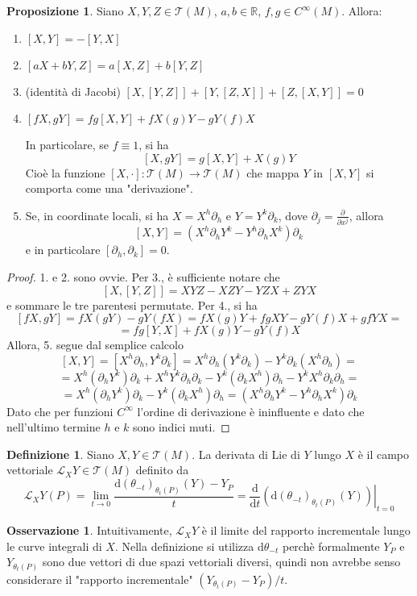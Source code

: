 \documentclass[a4paper,11pt]{article}
\theoremstyle{definition}
\newtheorem{osservazione}{Osservazione}[section]
\newtheorem{definizione}{Definizione}[section]
\theoremstyle{theorem}
\newtheorem{proposizione}{Proposizione}[section]
\newcommand{\lie}[2]{\mathcal{L}_{#1}#2}
\newcommand{\dif}{\mathrm{d}}
\begin{document}
\begin{proposizione}
	Siano $X,Y,Z\in\mathcal{T}(M)$, $a,b\in\mathbb{R}$, $f,g\in C^\infty(M)$. Allora:
	\begin{enumerate}
		\item $[X,Y]=-[Y,X]$
		\item $[aX+bY,Z]=a[X,Z]+b[Y,Z]$
		\item (identità di Jacobi) $[X,[Y,Z]]+[Y,[Z,X]]+[Z,[X,Y]]=0$
		\item $[fX,gY]=fg[X,Y]+fX(g)Y-gY(f)X$
		
		In particolare, se $f\equiv 1$, si ha \[[X,gY]=g[X,Y]+X(g)Y\]
		Cioè la funzione $[X,\cdot]\colon\mathcal{T}(M)\to\mathcal{T}(M)$ che mappa $Y$ in $[X,Y]$ si comporta come una "derivazione".
		\item Se, in coordinate locali, si ha
		$X=X^h\partial_h$ e
		$Y=Y^k\partial_k$, dove $\partial_j=\frac{\partial}{\partial x^j}$, allora
		\[[X,Y]=\left(X^h\partial_hY^k-Y^h\partial_hX^k\right)\partial_k\]
		e in particolare
		$[\partial_h,\partial_k]=0$.
	\end{enumerate}
\end{proposizione}
\begin{proof}
	1. e 2. sono ovvie. Per 3., è sufficiente notare che
	\[[X,[Y,Z]]=XYZ-XZY-YZX+ZYX\]
	e sommare le tre parentesi permutate. Per 4., si ha
	\[[fX,gY]=fX(gY)-gY(fX)=fX(g)Y+fgXY-gY(f)X+gfYX=\]\[=fg[Y,X]+fX(g)Y-gY(f)X\]
	Allora, 5. segue dal semplice calcolo
	\[[X,Y]=[X^h\partial_h,Y^k\partial_k]=X^h\partial_h(Y^k\partial_k)-Y^k\partial_k(X^h\partial_h)=\]
	\[=X^h(\partial_hY^k)\partial_k+X^hY^k\partial_h\partial_k-Y^k(\partial_kX^h)\partial_h-Y^kX^h\partial_k\partial_h=\]
	\[=X^h(\partial_hY^k)\partial_k-Y^k(\partial_kX^h)\partial_h=\left(X^h\partial_hY^k-Y^h\partial_hX^k\right)\partial_k\]
	Dato che per funzioni $C^\infty$ l'ordine di derivazione è ininfluente e dato che nell'ultimo termine $h$ e $k$ sono indici muti.
\end{proof}
\begin{definizione}
	Siano $X,Y\in\mathcal{T}(M)$. La derivata di Lie di $Y$ lungo $X$ è il campo vettoriale $\mathcal{L}_XY\in\mathcal{T}(M)$ definito da
	\[\lie{X}{Y}(P)=\lim\limits_{t\to0}\frac{\dif(\theta_{-t})_{\theta_t(P)}(Y)-Y_P}{t}=\frac{\dif}{\dif t}\left.\left(\dif(\theta_{-t})_{\theta_t(P)}(Y)\right)\right|_{t=0}\]
\end{definizione}
\begin{osservazione}
	Intuitivamente, $\lie{X}{Y}$ è il limite del rapporto incrementale lungo le curve integrali di $X$. Nella definizione si utilizza $\dif\theta_{-t}$ perchè formalmente $Y_P$ e $Y_{\theta_t(P)}$ sono due vettori di due spazi vettoriali diversi, quindi non avrebbe senso considerare il "rapporto incrementale" $(Y_{\theta_t(P)}-Y_P)/t$.
\end{osservazione}
\end{document}
